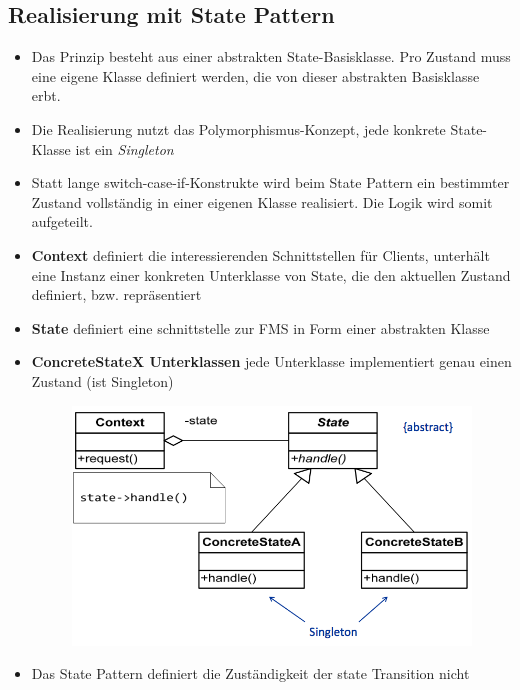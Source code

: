\subsection{Realisierung mit State Pattern}
\begin{itemize}
      \item Das Prinzip besteht aus einer abstrakten State-Basisklasse. Pro Zustand
            muss eine eigene Klasse definiert werden, die von dieser abstrakten
            Basisklasse erbt.
      \item Die Realisierung nutzt das Polymorphismus-Konzept, jede konkrete
            State-Klasse ist ein \textit{Singleton}
      \item Statt lange switch-case-if-Konstrukte wird beim State Pattern ein
            bestimmter Zustand vollständig in einer eigenen Klasse realisiert. Die Logik
            wird somit aufgeteilt.
      \item \textbf{Context} definiert die interessierenden Schnittstellen für
            Clients, unterhält eine Instanz einer konkreten Unterklasse von State, die den
            aktuellen Zustand definiert, bzw. repräsentiert
      \item \textbf{State} definiert eine schnittstelle zur FMS in Form einer
            abstrakten Klasse
      \item \textbf{ConcreteStateX Unterklassen} jede Unterklasse implementiert
            genau einen Zustand (ist Singleton)
            \begin{figure}[h]
                  \centering
                  \includegraphics[scale = 0.3]{images/FSM/state_pattern}
            \end{figure}
      \item Das State Pattern definiert die Zuständigkeit der state Transition nicht

\end{itemize}
